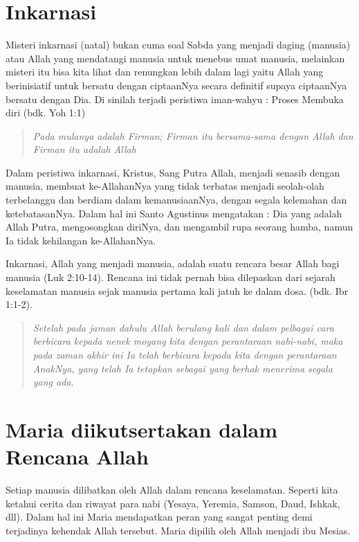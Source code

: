 
\section*{Inkarnasi}

\small
Misteri inkarnasi (natal) bukan cuma soal Sabda yang menjadi daging (manusia) atau  Allah yang mendatangi manusia untuk menebus umat manusia, melainkan misteri itu bisa kita lihat dan renungkan lebih dalam lagi yaitu Allah yang berinisiatif untuk bersatu dengan ciptaanNya secara definitif supaya ciptaanNya bersatu dengan Dia. Di sinilah terjadi peristiwa iman-wahyu : Proses Membuka diri (bdk. Yoh 1:1)
\begin{quote}
\textit{Pada mulanya adalah Firman; Firman itu bersama-sama dengan Allah dan Firman itu adalah Allah}
\end{quote}

Dalam peristiwa inkarnasi, Kristus, Sang Putra Allah, menjadi senasib dengan manusia, membuat ke-AllahanNya yang tidak terbatas menjadi seolah-olah terbelanggu dan berdiam dalam kemanusiaanNya, dengan segala kelemahan dan ketebatasanNya. Dalam hal ini Santo Agustinus mengatakan : Dia yang adalah Allah Putra, mengosongkan diriNya, dan mengambil rupa seorang hamba, namun Ia tidak kehilangan ke-AllahanNya.
	
Inkarnasi, Allah yang menjadi manusia, adalah suatu rencara besar Allah bagi manusia (Luk 2:10-14). Rencana ini tidak pernah bisa dilepaskan dari sejarah keselamatan manusia sejak manusia pertama kali jatuh ke dalam dosa.
(bdk. Ibr 1:1-2).
\begin{quote}
\textit{Setelah pada jaman dahulu Allah berulang kali dan dalam pelbagai cara berbicara kepada nenek moyang kita dengan perantaraan nabi-nabi, maka pada zaman akhir ini Ia telah berbicara kepada kita dengan perantaraan AnakNya, yang telah Ia tetapkan sebagai yang berhak menerima segala yang ada.}
\end{quote}

\section*{Maria diikutsertakan dalam Rencana Allah}

Setiap manusia dilibatkan oleh Allah dalam rencana keselamatan. Seperti kita ketahui cerita dan riwayat para nabi (Yesaya, Yeremia, Samson, Daud, Ishkak, dll). Dalam hal ini Maria mendapatkan peran yang sangat penting demi terjadinya kehendak Allah tersebut. Maria dipilih oleh Allah menjadi ibu Mesias.

